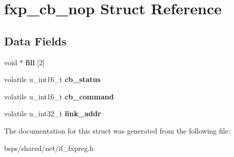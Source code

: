 \hypertarget{structfxp__cb__nop}{}\section{fxp\+\_\+cb\+\_\+nop Struct Reference}
\label{structfxp__cb__nop}
\subsection*{Data Fields}
\begin{DoxyCompactItemize}
\item 
\mbox{\label{structfxp__cb__nop_a1c9fc60076f8d68128512905240613aa}} 
void $\ast$ {\bfseries fill} \mbox{[}2\mbox{]}
\item 
\mbox{\label{structfxp__cb__nop_a47081f2d608f25a35f4551a33af53dab}} 
volatile u\+\_\+int16\+\_\+t {\bfseries cb\+\_\+status}
\item 
\mbox{\label{structfxp__cb__nop_abc97a775ebfe1407badfd56fc9e5fc2a}} 
volatile u\+\_\+int16\+\_\+t {\bfseries cb\+\_\+command}
\item 
\mbox{\label{structfxp__cb__nop_a2f179a91fd5b1caef412f1f01be95c43}} 
volatile u\+\_\+int32\+\_\+t {\bfseries link\+\_\+addr}
\end{DoxyCompactItemize}


The documentation for this struct was generated from the following file\+:\begin{DoxyCompactItemize}
\item 
bsps/shared/net/if\+\_\+fxpreg.\+h\end{DoxyCompactItemize}
